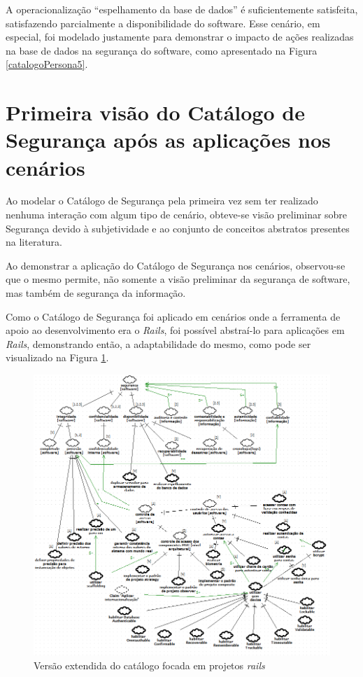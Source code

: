A operacionalização “espelhamento da base de dados” é suficientemente satisfeita, satisfazendo parcialmente a disponibilidade do software. Esse cenário, em especial, foi modelado justamente para demonstrar o impacto de ações realizadas na base de dados na segurança do software, como apresentado na Figura \ref{catalogoPersona5}.


\section{Primeira visão do Catálogo de Segurança após as aplicações nos cenários}
\label{sec:aplicacaoDoCatalogo}

Ao modelar o Catálogo de Segurança pela primeira vez sem ter realizado nenhuma interação com algum tipo de cenário, obteve-se visão preliminar sobre Segurança devido à subjetividade e ao conjunto de conceitos abstratos presentes na literatura.  

Ao demonstrar a aplicação do Catálogo de Segurança nos cenários, observou-se que o mesmo permite, não somente a visão preliminar da segurança de software, mas também de segurança da informação.

Como o Catálogo de Segurança foi aplicado em cenários onde a ferramenta de apoio ao desenvolvimento era o \textit{Rails}, foi possível abstraí-lo para aplicações em \textit{Rails}, demonstrando então, a adaptabilidade do mesmo, como pode ser visualizado na Figura \ref{catalogoFull}.

\begin{figure}[h!]
	\centering
	\includegraphics[keepaspectratio=true,scale=0.65]{figuras/catalogoFull.PNG}
	\caption{Versão extendida do catálogo focada em projetos \textit{rails}}
	\label{catalogoFull}
\end{figure}


